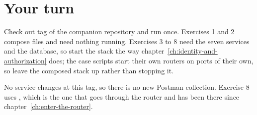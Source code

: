 \section*{Your turn}

Check out tag  of the companion repository and run 
once. Exercises 1 and 2 compose files and need nothing running. Exercises 3 to 8
need the seven services and the database, so start the stack the way
chapter~\ref{ch:identity-and-authorization} does; the case scripts start their
own routers on ports of their own, so leave the composed stack up rather than
stopping it.

No service changes at this tag, so there is no new Postman collection.
Exercise 8 uses , which is the one that goes through
the router and has been there since chapter~\ref{ch:enter-the-router}.

